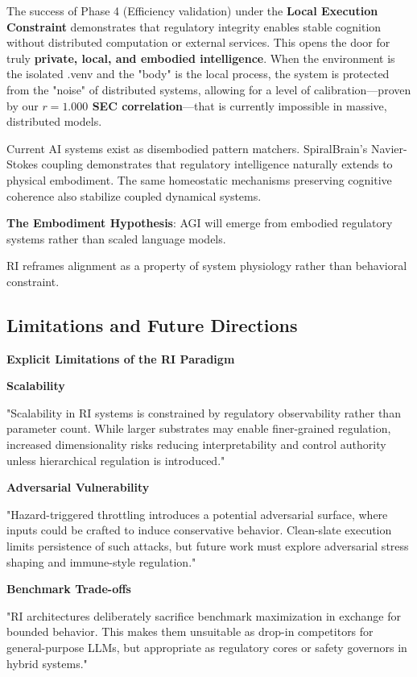 \documentclass[12pt,a4paper]{report}
\begin{document}
The success of Phase 4 (Efficiency validation) under the \textbf{Local Execution Constraint} demonstrates that regulatory integrity enables stable cognition without distributed computation or external services. This opens the door for truly \textbf{private, local, and embodied intelligence}. When the environment is the isolated .venv and the "body" is the local process, the system is protected from the "noise" of distributed systems, allowing for a level of calibration—proven by our \textbf{$r = 1.000$ SEC correlation}—that is currently impossible in massive, distributed models.

Current AI systems exist as disembodied pattern matchers. SpiralBrain's Navier-Stokes coupling demonstrates that regulatory intelligence naturally extends to physical embodiment. The same homeostatic mechanisms preserving cognitive coherence also stabilize coupled dynamical systems.

\textbf{The Embodiment Hypothesis}: AGI will emerge from embodied regulatory systems rather than scaled language models.

RI reframes alignment as a property of system physiology rather than behavioral constraint.

\subsection{Limitations and Future Directions}

\textbf{Explicit Limitations of the RI Paradigm}

\textbf{Scalability}

"Scalability in RI systems is constrained by regulatory observability rather than parameter count. While larger substrates may enable finer-grained regulation, increased dimensionality risks reducing interpretability and control authority unless hierarchical regulation is introduced."

\textbf{Adversarial Vulnerability}

"Hazard-triggered throttling introduces a potential adversarial surface, where inputs could be crafted to induce conservative behavior. Clean-slate execution limits persistence of such attacks, but future work must explore adversarial stress shaping and immune-style regulation."

\textbf{Benchmark Trade-offs}

"RI architectures deliberately sacrifice benchmark maximization in exchange for bounded behavior. This makes them unsuitable as drop-in competitors for general-purpose LLMs, but appropriate as regulatory cores or safety governors in hybrid systems."
\end{document}

